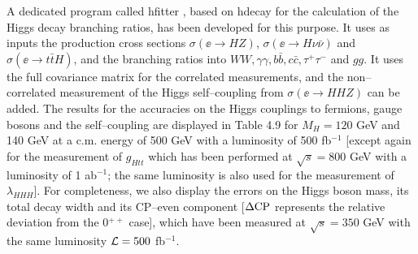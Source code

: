 A dedicated program called {\sc hfitter} \cite{Hfitter}, based on {\sc hdecay}
\cite{HDECAY} for the calculation of the Higgs decay branching ratios, has been
developed for this purpose. It uses as inputs the production cross sections
$\sigma(\ee \to HZ)$, $\sigma(\ee \to H\nu \bar{\nu})$ and $\sigma(\ee \to
t\bar{t}H)$, and the branching ratios into $WW, \gamma \gamma, b\bar{b},
c\bar{c}, \tau^+ \tau^-$ and $gg$. It uses the full covariance matrix for the
correlated measurements, and the non--correlated measurement of the Higgs
self--coupling from $\sigma( \ee \to HHZ)$ can be added.  The results for the
accuracies on the Higgs couplings to fermions, gauge bosons and the
self--coupling are displayed in Table 4.9 for $M_H=120$ GeV and 140 GeV at a
c.m. energy of 500 GeV with a luminosity of 500 fb$^{-1}$  [except again for
the measurement of $g_{Htt}$ which has been performed at  $\sqrt{s}=800$ GeV
with a luminosity of 1 ab$^{-1}$; the same luminosity is also used for the
measurement of $\lambda_{HHH}$].  For completeness, we also display the errors
on the Higgs boson mass, its total decay width and its CP--even component
[$\Delta {\rm CP}$ represents the relative deviation from the 0$^{++}$ case],
which have been measured at $\sqrt{s}=350$ GeV  with the same luminosity ${\cal
L} =500$ fb$^{-1}$. \s 

